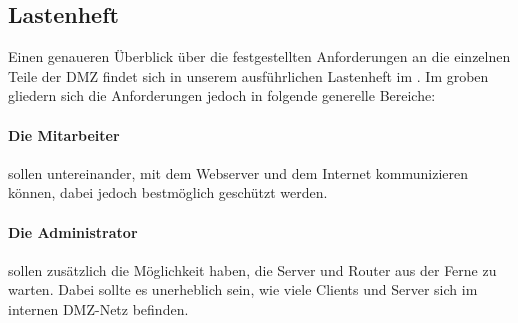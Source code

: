 \subsection{Lastenheft}
\label{sec:Lastenheft}
Einen genaueren Überblick über die festgestellten Anforderungen an die einzelnen Teile der \ac{DMZ} findet sich in unserem ausführlichen Lastenheft im . Im groben gliedern sich die Anforderungen jedoch in folgende generelle Bereiche:

\paragraph*{Die Mitarbeiter} sollen untereinander, mit dem Webserver und dem Internet kommunizieren können, dabei jedoch bestmöglich geschützt werden.
\paragraph*{Die Administrator} sollen zusätzlich die Möglichkeit haben, die Server und Router aus der Ferne zu warten. Dabei sollte es unerheblich sein, wie viele Clients und Server sich im internen \bzw \ac{DMZ}-Netz befinden.

